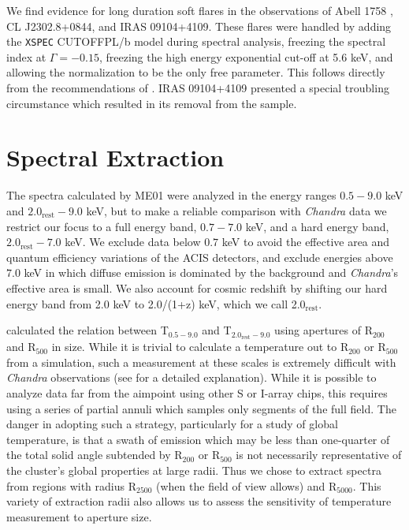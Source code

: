 \documentclass{emulateapj}
\begin{document}
We find evidence for long duration soft flares in the
observations of Abell 1758 \citep{2004ApJ...613..831D}, CL
J2302.8+0844, and IRAS 09104+4109. These flares were handled
by adding the {\tt XSPEC} CUTOFFPL/b model during spectral analysis, freezing
the spectral index at $\Gamma=-0.15$, freezing the high energy
exponential cut-off at 5.6 keV, and allowing the normalization to be the
only free parameter. This follows directly from the recommendations of
\cite{2003ApJ...583...70M}. IRAS 09104+4109 presented a special
troubling circumstance which resulted in its removal from the sample.

\section{Spectral Extraction} \label{sec:extraction}

The spectra calculated by ME01 were analyzed in the energy ranges
$0.5-9.0$ keV and $2.0_{\text{rest}}-9.0$ keV, but to make a reliable comparison with
{\textit{Chandra}} data we restrict our focus to a full energy band, $0.7-7.0$ keV, and
a hard energy band, $2.0_{\text{rest}}-7.0$ keV. We exclude data below $0.7$ keV to avoid the
effective area and quantum efficiency variations of the ACIS detectors, and
exclude energies above $7.0$ keV in which diffuse emission is
dominated by the background and {\textit{Chandra}'s} effective area is
small. We also account for cosmic redshift by shifting our hard energy
band from 2.0 keV to 2.0/(1+z) keV, which we call 2.0$_{\text{rest}}$.

\cite{2001ApJ...546..100M} calculated the relation between
T$_{0.5-9.0}$ and T$_{2.0_{\text{rest}}-9.0}$ using apertures of R$_{200}$ and
R$_{500}$ in size. While it is trivial to calculate a temperature out
to R$_{200}$ or R$_{500}$ from a simulation, such a measurement at
these scales is extremely difficult with {\textit{Chandra}}
observations (see \cite{2005ApJ...628..655V} for a detailed
explanation). While it is possible to analyze data far from the
aimpoint using other S or I-array chips, this requires using a
series of partial annuli which samples only segments of the 
full field. The danger in adopting such a strategy, particularly for a
study of global temperature, is that a swath of
emission which may be less than one-quarter of the total solid angle
subtended by R$_{200}$ or R$_{500}$ is not necessarily representative of the cluster's
global properties at large radii. Thus we chose to extract spectra
from regions with radius R$_{2500}$ (when the
field of view allows) and R$_{5000}$. This variety of extraction
radii also allows us to assess the sensitivity of temperature
measurement to aperture size.
\end{document}
